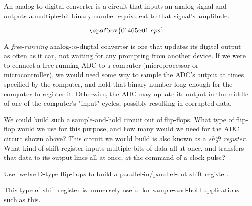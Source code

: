 

An analog-to-digital converter is a circuit that inputs an analog signal and outputs a multiple-bit binary number equivalent to that signal's amplitude:

$$\epsfbox{01465x01.eps}$$

A {\it free-running} analog-to-digital converter is one that updates its digital output as often as it can, not waiting for any prompting from another device.  If we were to connect a free-running ADC to a computer (microprocessor or microcontroller), we would need some way to sample the ADC's output at times specified by the computer, and hold that binary number long enough for the computer to register it.  Otherwise, the ADC may update its output in the middle of one of the computer's "input" cycles, possibly resulting in corrupted data.

We could build such a sample-and-hold circuit out of flip-flops.  What type of flip-flop would we use for this purpose, and how many would we need for the ADC circuit shown above?  This circuit we would build is also known as a {\it shift register}.  What kind of shift register inputs multiple bits of data all at once, and transfers that data to its output lines all at once, at the command of a clock pulse?







Use twelve D-type flip-flops to build a parallel-in/parallel-out shift register.







This type of shift register is immensely useful for sample-and-hold applications such as this.




